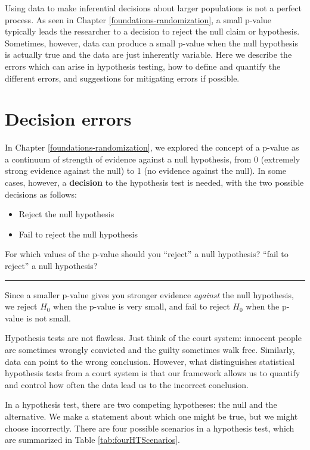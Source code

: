 \documentclass[
  10pt,
  openany]{book}
\providecommand{\tightlist}{%
  \setlength{\itemsep}{0pt}\setlength{\parskip}{0pt}}
\theoremstyle{definition}
\theoremstyle{definition}
\theoremstyle{definition}
\theoremstyle{definition}
\theoremstyle{remark}
\begin{document}
Using data to make inferential decisions about larger populations is not a perfect process.
As seen in Chapter \ref{foundations-randomization}, a small p-value typically leads the researcher to a decision to reject the null claim or hypothesis.
Sometimes, however, data can produce a small p-value when the null hypothesis is actually true and the data are just inherently variable.
Here we describe the errors which can arise in hypothesis testing, how to define and quantify the different errors, and suggestions for mitigating errors if possible.

\section{Decision errors}\label{decerr}

In Chapter \ref{foundations-randomization}, we explored the concept of a p-value as a continuum of strength of evidence against a null hypothesis, from 0 (extremely strong evidence against the null) to 1 (no evidence against the null). In some cases, however, a \textbf{decision} to the hypothesis test is needed, with the two possible decisions as follows:

\begin{itemize}
\tightlist
\item
  Reject the null hypothesis
\item
  Fail to reject the null hypothesis
\end{itemize}

For which values of the p-value should you ``reject'' a null hypothesis? ``fail to reject'' a null hypothesis?

\begin{center}\rule{0.5\linewidth}{0.5pt}\end{center}

Since a smaller p-value gives you stronger evidence \emph{against} the null hypothesis, we reject \(H_0\) when the p-value is very small, and fail to reject \(H_0\) when the p-value is not small.

Hypothesis tests are not flawless. Just think of the court system: innocent people are sometimes wrongly convicted and the guilty sometimes walk free. Similarly, data can point to the wrong conclusion. However, what distinguishes statistical hypothesis tests from a court system is that our framework allows us to quantify and control how often the data lead us to the incorrect conclusion.

In a hypothesis test, there are two competing hypotheses: the null and the alternative. We make a statement about which one might be true, but we might choose incorrectly.
There are four possible scenarios in a hypothesis test, which are summarized in Table \ref{tab:fourHTScenarios}.
\end{document}
